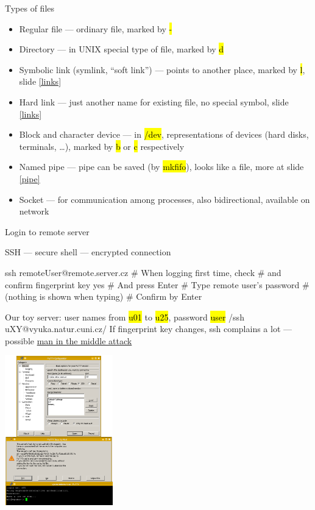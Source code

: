 \documentclass[compress, ucs, xelatex, 11pt, xcolor=svgnames,
  hyperref={
    bookmarks=true,
    unicode=true,
    colorlinks=true,
    pdftitle={Linux, command line and MetaCentrum},
    plainpages=false,
    pdfauthor={Vojtech Zeisek},
    pdfsubject={Course about use of Linux command line, writing shell scripts and using MetaCentrum of CESNET},
    pdfcreator={XeLaTeX, http://www.xelatex.org/},
    pdfkeywords={Linux, GNU, BASH, shell, command line, MetaCentrum},
    linkcolor=Sienna,
    anchorcolor=black,
    citecolor=green,
    filecolor=magenta,
    menucolor=Sienna,
    urlcolor=cyan,
    pdftex},
  url={hyphens, lowtilde} %
  ]{beamer}
\renewcommand{\texttt}[1]{\hl{\ttfamily #1}}
\begin{document}
\begin{frame}{Types of files}
\begin{itemize}
  \item Regular file --- ordinary file, marked by \texttt{-}
  \item Directory --- in UNIX special type of file, marked by \texttt{d}
  \item Symbolic link (symlink, ``soft link'') --- points to another place, marked by \texttt{l}, slide \ref{links}
  \item Hard link --- just another name for existing file, no special symbol, slide \ref{links}
  \item Block and character device --- in \texttt{/dev}, representations of devices (hard disks, terminals, \ldots), marked by \texttt{b} or \texttt{c} respectively
  \item Named pipe --- pipe can be saved (by \texttt{mkfifo}), looks like a file, more at slide \ref{pipe}
  \item Socket --- for communication among processes, also bidirectional, available on network
\end{itemize}
\end{frame}

\begin{frame}[fragile]{Login to remote server}
\begin{multicols}{2}
  SSH --- secure shell --- encrypted connection
  \begin{bashcode}
    ssh remoteUser@remote.server.cz
    # When logging first time, check
    # and confirm fingerprint key
    yes # And press Enter
    # Type remote user's password
    # (nothing is shown when typing)
    # Confirm by Enter
  \end{bashcode}
  Our toy server: user names from \texttt{u01} to \texttt{u25}, password \texttt{user}
  \bash/ssh uXY@vyuka.natur.cuni.cz/
  If fingerprint key changes, ssh complains a lot --- possible \href{https://en.wikipedia.org/wiki/Man-in-the-middle_attack}{man in the middle attack}
  \columnbreak
  \begin{center}
    \includegraphics[height=6.5cm]{putty.png}
  \end{center}
\end{multicols}
\end{frame}
\end{document}
